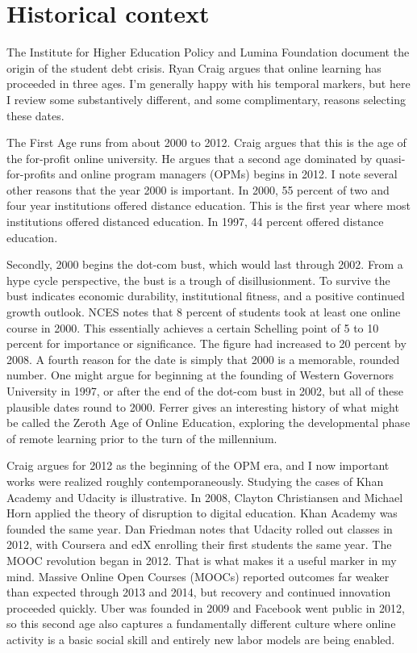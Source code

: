 \documentclass[review]{elsarticle}
\begin{document}
    \section{Historical context}

    The Institute for Higher Education Policy and Lumina Foundation document the origin of the student debt crisis\cite{foundation_2017}.
    Ryan Craig argues that online learning has proceeded in three ages. I'm generally happy with his temporal markers,
    but here I review some substantively different, and some complimentary, reasons selecting these dates.
    
    The First Age runs from about 2000 to 2012. Craig argues that this is the age of the for-profit online university.
    He argues that a second age dominated by quasi-for-profits and online program managers (OPMs) begins in 2012.
    I note several other reasons that the year 2000 is important.
    In 2000, 55 percent of two and four year institutions offered distance education\cite{tabs2003distance}.
    This is the first year where most institutions offered distanced education.
    In 1997, 44 percent offered distance education\cite{sikora2002profile}.

    Secondly, 2000 begins the dot-com bust, which would last through 2002\cite{wollscheid2012rise}.
    From a hype cycle perspective, the bust is a trough of disillusionment.
    To survive the bust indicates economic durability, institutional fitness, and a positive continued growth outlook.
    NCES notes that 8 percent of students took at least one online course in 2000\cite{radford2011learning}.
    This essentially achieves a certain Schelling point of 5 to 10 percent for importance or significance.
    The figure had increased to 20 percent by 2008.
    A fourth reason for the date is simply that 2000 is a memorable, rounded number.
    One might argue for beginning at the founding of Western Governors University in 1997, or after the end of the dot-com bust in 2002, but all of these plausible dates round to 2000.
    Ferrer gives an interesting history of what might be called the Zeroth Age of Online Education, exploring the developmental phase of remote learning prior to the turn of the millennium\cite{ferrer_2019}.

    Craig argues for 2012 as the beginning of the OPM era, and I now  important works were realized roughly contemporaneously.
    Studying the cases of Khan Academy and Udacity is illustrative.
    In 2008, Clayton Christiansen and Michael Horn applied the theory of disruption to digital education\cite{horn2008disrupting}.
    Khan Academy was founded the same year\cite{tucker_2018}.
    Dan Friedman\cite{friedman2014mooc} notes that Udacity rolled out classes in 2012, with Coursera and edX enrolling their first students the same year.
    The MOOC revolution began in 2012. That is what makes it a useful marker in my mind.
    Massive Online Open Courses (MOOCs) reported outcomes far weaker than expected through 2013 and 2014, but recovery and continued innovation proceeded quickly.
    Uber was founded in 2009 and Facebook went public in 2012, so this second age also captures a fundamentally different culture where online activity is a basic social skill and entirely new labor models are being enabled.
\end{document}
